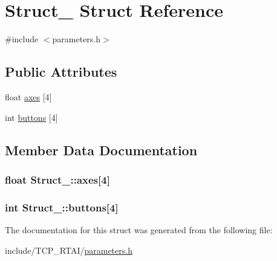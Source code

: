 \hypertarget{structStruct__3}{
\section{Struct\_ Struct Reference}
\label{structStruct__3}
}


{\ttfamily \#include $<$parameters.h$>$}

\subsection*{Public Attributes}
\begin{DoxyCompactItemize}
\item 
float \hyperlink{structStruct__3_a0fcce7b0fea0b5bb71ef8461d3d699eb}{axes} \mbox{[}4\mbox{]}
\item 
int \hyperlink{structStruct__3_a04f4bfbedd07f96aa443adb2e16e50fb}{buttons} \mbox{[}4\mbox{]}
\end{DoxyCompactItemize}


\subsection{Member Data Documentation}
\hypertarget{structStruct__3_a0fcce7b0fea0b5bb71ef8461d3d699eb}{
\subsubsection[{axes}]{\setlength{\rightskip}{0pt plus 5cm}float {\bf Struct\_::axes}\mbox{[}4\mbox{]}}}
\label{structStruct__3_a0fcce7b0fea0b5bb71ef8461d3d699eb}
\hypertarget{structStruct__3_a04f4bfbedd07f96aa443adb2e16e50fb}{
\subsubsection[{buttons}]{\setlength{\rightskip}{0pt plus 5cm}int {\bf Struct\_::buttons}\mbox{[}4\mbox{]}}}
\label{structStruct__3_a04f4bfbedd07f96aa443adb2e16e50fb}


The documentation for this struct was generated from the following file:\begin{DoxyCompactItemize}
\item 
include/TCP\_\-RTAI/\hyperlink{include_2TCP__RTAI_2parameters_8h}{parameters.h}\end{DoxyCompactItemize}
